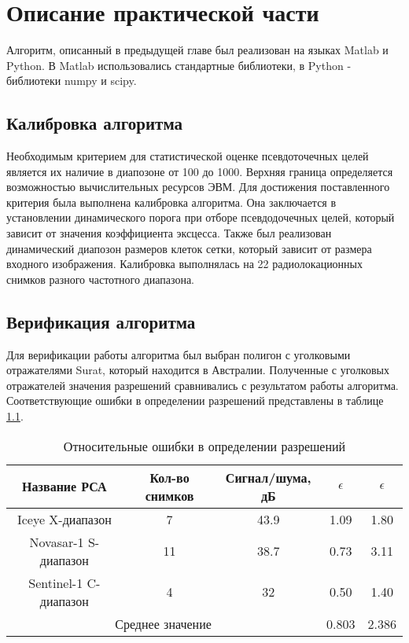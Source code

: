 \chapter{Описание практической части}
\label{sec:Chapter4} 

	Алгоритм, описанный в предыдущей главе был реализован на языках Matlab и Python. В Matlab использовались  стандартные библиотеки, в Python - библиотеки numpy и scipy. 
	
\section{Калибровка алгоритма}

	Необходимым критерием для статистической оценке псевдоточечных целей является их наличие в диапозоне от 100 до 1000. Верхняя граница определяется возможностью вычислительных ресурсов ЭВМ. Для достижения поставленного критерия была выполнена калибровка алгоритма. Она заключается в установлении динамического порога при отборе псевдодочечных целей, который зависит от значения коэффициента эксцесса. Также был реализован динамический диапозон размеров клеток сетки, который зависит от размера входного изображения. Калибровка выполнялась на 22 радиолокационных снимков разного частотного диапазона.

\section{Верификация алгоритма}

	Для верификации работы алгоритма был выбран полигон с уголковыми отражателями Surat, который находится в Австралии. Полученные с уголковых отражателей значения разрешений сравнивались с результатом работы алгоритма. Соответствующие ошибки в определении разрешений представлены в таблице \ref{tab:errors}.
	
\begin{table}[]
    \centering
    \caption{Относительные ошибки в определении разрешений}
    \label{tab:errors}
    \begin{tabular}{|c|c|c|c|c|}
        \hline
        Название РСА  & Кол-во снимков  & Сигнал/шума, дБ  & $\epsilon$ & $\epsilon$  \\ \hline
        Iceye X-диапазон      & 7  & 43.9 & 1.09 & 1.80  \\ \hline
        Novasar-1 S-диапазон  & 11 & 38.7 & 0.73 & 3.11\\ \hline
        Sentinel-1 C-диапазон & 4  & 32   & 0.50 & 1.40  \\ \hline
        \multicolumn{3}{|c|}{Среднее значение} &  0.803 & 2.386 \\ \hline
    \end{tabular}
\end{table}

